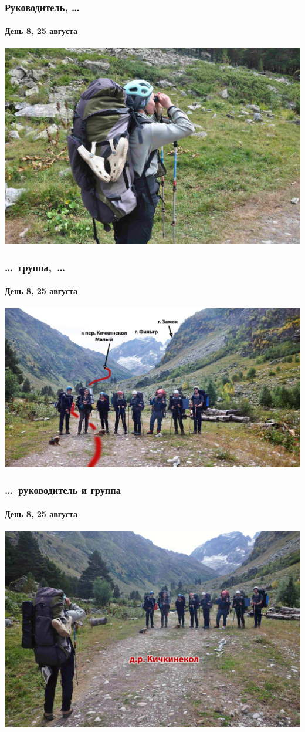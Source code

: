 \begin{frame}
	\frametitle{Руководитель, \dots}
	\framesubtitle{День 8, 25 августа}
	\centering
	\includegraphics[width=\textwidth]{../pics/DSC_0128}			
\end{frame}

\begin{frame}
	\frametitle{\dots~группа,~\dots}
	\framesubtitle{День 8, 25 августа}
	\centering
	\includegraphics[width=\textwidth]{../pics/DSC_0127}			
\end{frame}

\begin{frame}
	\frametitle{\dots~руководитель и группа}
	\framesubtitle{День 8, 25 августа}
	\centering
	\includegraphics[width=\textwidth]{../pics/DSC_0134}			
\end{frame}

